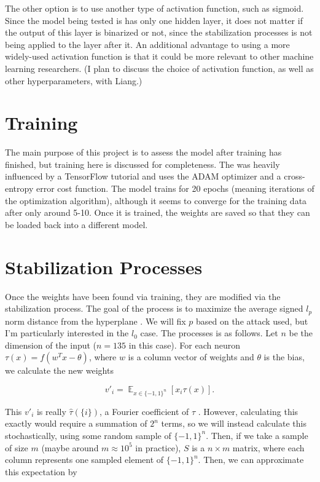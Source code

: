 \documentclass{article}
\DeclareMathOperator*{\E}{\mathbb{E}}
\DeclareMathOperator{\1}{\mathbb{1}}
\begin{document}
The other option is to use another type of activation function, such as sigmoid. Since the model being tested is has only one hidden layer, it does not matter if the output of this layer is binarized or not, since the stabilization processes is not being applied to the layer after it. An additional advantage to using a more widely-used activation function is that it could be more relevant to other machine learning researchers. (I plan to discuss the choice of activation function, as well as other hyperparameters, with Liang.)

\section{Training}

The main purpose of this project is to assess the model after training has finished, but training here is discussed for completeness. The was heavily influenced by a TensorFlow tutorial \cite{tftut} and uses the ADAM optimizer and a cross-entropy error cost function. The model trains for 20 epochs (meaning iterations of the optimization algorithm), although it seems to converge for the training data after only around 5-10. Once it is trained, the weights are saved so that they can be loaded back into a different model.

\section{Stabilization Processes}

Once the weights have been found via training, they are modified via the stabilization process. The goal of the process is to maximize the average signed $l_p$ norm distance from the hyperplane \cite{cod2}. We will fix $p$ based on the attack used, but I'm particularly interested in the $l_0$ case. The processes is as follows. Let $n$ be the dimension of the input ($n = 135$ in this case). For each neuron $\tau(x) = f(w^Tx - \theta)$, where $w$ is a column vector of weights and $\theta$ is the bias, we calculate the new weights

$$v'_i = \E_{x \in \{-1, 1\}^n}[x_i \tau(x)].$$

This $v'_i$ is really $\hat\tau(\{i\})$, a Fourier coefficient of $\tau$ \cite{bool}. However, calculating this exactly would require a summation of $2^{n}$ terms, so we will instead calculate this stochastically, using some random sample of $\{-1, 1\}^n$. Then, if we take a sample of size $m$ (maybe around $m \approx 10^5$ in practice), $S$ is a $n \times m$ matrix, where each column represents one sampled element of $\{-1, 1\}^n$. Then, we can approximate this expectation by
\end{document}
